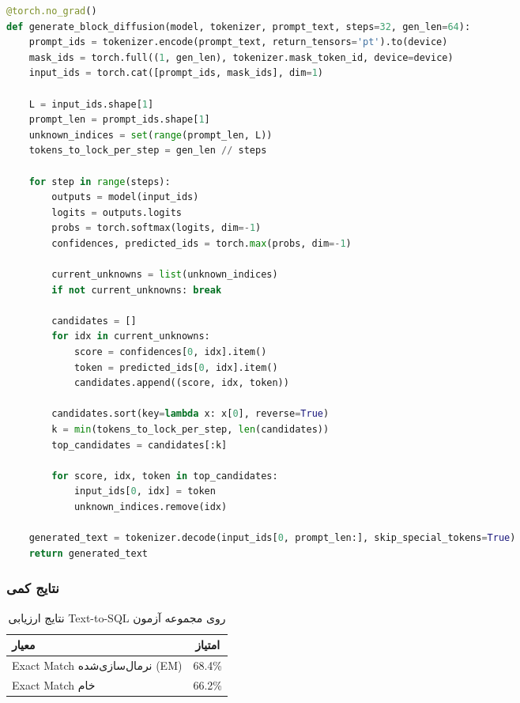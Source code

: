 \documentclass[12pt,a4paper]{article}
\theoremstyle{definition}
\begin{document}
\begin{lstlisting}[language=Python, caption=قطعه کد انتشار بلوکی]
@torch.no_grad()
def generate_block_diffusion(model, tokenizer, prompt_text, steps=32, gen_len=64):
    prompt_ids = tokenizer.encode(prompt_text, return_tensors='pt').to(device)
    mask_ids = torch.full((1, gen_len), tokenizer.mask_token_id, device=device)
    input_ids = torch.cat([prompt_ids, mask_ids], dim=1)
    
    L = input_ids.shape[1]
    prompt_len = prompt_ids.shape[1]
    unknown_indices = set(range(prompt_len, L))
    tokens_to_lock_per_step = gen_len // steps
    
    for step in range(steps):
        outputs = model(input_ids)
        logits = outputs.logits
        probs = torch.softmax(logits, dim=-1)
        confidences, predicted_ids = torch.max(probs, dim=-1)
        
        current_unknowns = list(unknown_indices)
        if not current_unknowns: break
        
        candidates = []
        for idx in current_unknowns:
            score = confidences[0, idx].item()
            token = predicted_ids[0, idx].item()
            candidates.append((score, idx, token))
        
        candidates.sort(key=lambda x: x[0], reverse=True)
        k = min(tokens_to_lock_per_step, len(candidates))
        top_candidates = candidates[:k]
        
        for score, idx, token in top_candidates:
            input_ids[0, idx] = token
            unknown_indices.remove(idx)
    
    generated_text = tokenizer.decode(input_ids[0, prompt_len:], skip_special_tokens=True)
    return generated_text
\end{lstlisting}

\subsubsection*{نتایج کمی}
\begin{table}[H]
    \centering
    \begin{tabular}{lc}
        \toprule
        \textbf{معیار} & \textbf{امتیاز} \\
        \midrule
        Exact Match نرمال‌سازی‌شده (EM) & 68.4\% \\
        Exact Match خام & 66.2\% \\
        \bottomrule
    \end{tabular}
    \caption{نتایج ارزیابی Text-to-SQL روی مجموعه آزمون}
\end{table}
\end{document}
